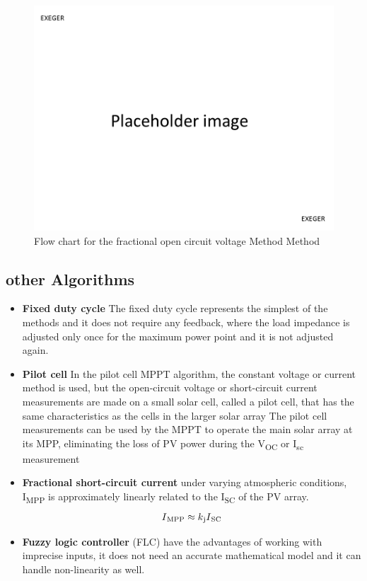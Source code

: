 {  \begin{figure}[H]
        \begin{center}
        \includegraphics[width=\textwidth]{images/pacehold}
        \caption{ Flow chart for the fractional open circuit voltage Method  Method }
        \label{fig:focflow}
        \end{center}
        \end{figure}
  
\subsection{other Algorithms}
  \begin{itemize}
  \item {\bf Fixed duty cycle} The fixed duty cycle represents the simplest of the methods and it does not require any feedback, where the load impedance is adjusted only once for the maximum power point and it is not adjusted again.
  \item {\bf Pilot cell} In the pilot cell MPPT algorithm, the constant voltage or current method is used, but the open-circuit voltage or short-circuit current measurements are made on a small solar cell, called a pilot cell, that has the same characteristics as the cells in the larger solar array The pilot cell measurements can be used by the MPPT to operate the main solar array at its MPP, eliminating the loss of PV power during the V\textsubscript{OC} or I\textsubscript{sc} measurement
  \item {\bf Fractional short-circuit current }  under varying atmospheric conditions, I\textsubscript{MPP} is approximately linearly related to the I\textsubscript{SC} of the PV array. \newline
    \begin{equation}
      \begin{aligned}
    I\textsubscript{MPP} \approx k\textsubscript{j}I\textsubscript{SC}
    \label{eq:equ_fracoc}
    \end{aligned}
    \end{equation}
   \item {\bf Fuzzy logic controller} (FLC) have the advantages of working with imprecise inputs, it does not need an accurate mathematical model and it can handle non-linearity as well.
  \end{itemize} 
  

}
